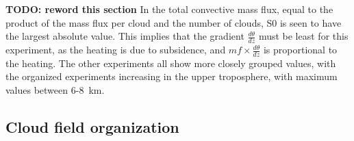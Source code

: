\documentclass[11pt,a4paper]{article}
\newcommand\todo[1]{\textbf{TODO: #1}}
\begin{document}

\todo{reword this section}
In the total convective mass flux, equal to the product of the mass flux per cloud and the number of clouds, S0 is seen to have the largest absolute value. This implies that the gradient $\frac{d \theta}{dz}$ must be least for this experiment, as the heating is due to subsidence, and $mf \times \frac{d \theta}{dz}$ is proportional to the heating. The other experiments all show more closely grouped values, with the organized experiments increasing in the upper troposphere, with maximum values between \SI{6}{}-\SI{8}{km}. 

\subsection{Cloud field organization}
\end{document}
